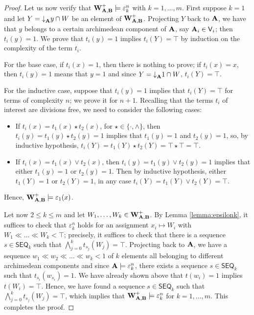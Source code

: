 \documentclass{amsart}
\theoremstyle{definition}
\numberwithin{equation}{section}
\newcommand{\join}{\vee}
\newcommand{\alg}[1]{{\textbf{\upshape #1}}}  %
\newcommand{\vv}[1]{\mathsf {#1}}
\begin{document}
\begin{proof}
Let us now verify that $\alg W_{\alg A, \alg B}^+ \models \varepsilon_k^n$ with $k = 1 , \dots, m$. First suppose $k=1$ and let $Y={\downarrow}_\alg A y\cap W$ be an element of $\alg W_{\alg A, \alg B}^+$. Projecting $Y$ back to $\alg A$, we have that $y$ belongs to a certain archimedean component of $\alg A$, say $\alg A_i \in \vv V_i$; then $t_i(y)=1$. We prove that $t_i(y)=1$ implies $t_i(Y)=\top$ by induction on the complexity of the term $t_i$.

For the base case, if $t_i(x)=1$, then there is nothing to prove; if $t_i(x)=x$, then $t_i(y)=1$ means that $y=1$ and since $Y={\downarrow}_\alg A 1 \cap W$, $t_i(Y)=\top$.

For the inductive case, suppose that $t_i(y)=1$ implies that $t_i(Y)=\top$ for terms of complexity $n$; we prove it for $n+1$. Recalling that the terms $t_i$ of interest are divisions free, we need to consider the following cases:
\begin{itemize}
\item If $t_i(x)=t_1(x)\star t_2(x)$, for $\star \in \{\cdot, \land\}$, then $t_i(y)=t_1(y)\star t_2(y)=1$ implies that $t_1(y)=1$ and $t_2(y)=1$, so, by inductive hypothesis, $t_i(Y)=t_1(Y)\star t_2(Y)=\top \star \top =\top$.
\item If $t_i(x)=t_1(x)\join t_2(x)$, then $t_i(y)=t_1(y)\join t_2(y)=1$ implies that either $t_1(y)=1$ or $t_2(y)=1$. Then by inductive hypothesis, either $t_1(Y)=1$ or $t_2(Y)=1$, in any case $t_i(Y)=t_1(Y)\join t_2(Y)=\top$.
\end{itemize}
Hence, $\alg W_{\alg A, \alg B}^+ \models \varepsilon_1(x)$. 

Let now $2 \leq k \leq m$ and let $W_1, \dots, W_k \in \alg W_{\alg A,\alg B}^+$. By Lemma \ref{lemma:epsilonk}, it suffices to check that $\varepsilon_k^n$ holds for an assignment $x_i \mapsto W_i$ with $W_1 \ll \dots \ll W_k < \top$; precisely, it suffices to check that there is a sequence $s \in \vv{SEQ}_k$ such that $\bigwedge_{j=0}^k t_{s_j}(W_j)=\top$. Projecting back to $\alg A$, we have a sequence $w_1 \ll w_2 \ll \dots \ll w_k < 1$ of $k$ elements all belonging to different archimedean components and since $\alg A \models \varepsilon_k^n$, there exists a sequence $s \in \vv{SEQ}_k$ such that $t_{s_i}(w_{s_i})=1$. We have already shown above that $t(w_i)=1$ implies $t(W_i)=\top$. 
Hence, we have found a sequence $s \in \vv{SEQ}_k$ such that $\bigwedge_{j=0}^k t_{s_j}(W_j)=\top$, which implies that $\alg W_{\alg A, \alg B}^+ \models \varepsilon_k^n$ for $k=1, \dots , m$. This completes the proof.
\end{proof}
\end{document}
